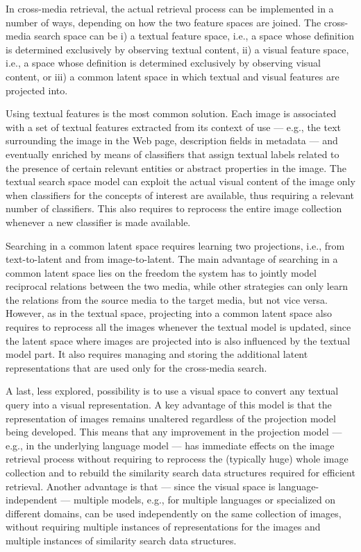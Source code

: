In cross-media retrieval, the actual retrieval process can be implemented in a number of ways, depending on how the two feature spaces are joined.
The cross-media search space can be i) a textual feature space, i.e.,  a space whose definition is determined exclusively by observing textual content, ii)
a visual feature space, i.e.,  a space whose definition is determined exclusively by observing visual content,
or iii) a common latent space in which textual and visual features are projected into.

Using textual features is the most common solution. %
Each image is associated with a set of textual features extracted from its context of use --- e.g., the text surrounding the image in the Web page, description fields in metadata --- and eventually enriched by means of classifiers that assign textual labels related to the presence of certain relevant entities or abstract properties in the image.
The textual search space model can exploit the actual visual content of the image only when classifiers for the concepts of interest are available, thus requiring a relevant number of classifiers.
This also requires to reprocess the entire image collection whenever a new classifier is made available.

Searching in a common latent space requires learning two projections, i.e.,  from text-to-latent and from image-to-latent.
The main advantage of searching in a common latent space lies on the freedom the system has to jointly model reciprocal relations between the two media, while other strategies can only learn the relations from the source media to the target media, but not vice versa.
However, as in the textual space, projecting into a common latent space also requires to reprocess all the images whenever the textual model is updated, since the latent space where images are projected into is also influenced by the textual model part.
It also requires managing and storing the additional latent representations that are used only for the cross-media search.

A last, less explored, possibility is to use a visual space to convert any textual query into a visual representation.
A key advantage of this model is that the representation of images remains unaltered regardless of the projection model being developed.
This means that any improvement in the projection model --- e.g., in the underlying language model --- has immediate effects on the image retrieval process without requiring to reprocess the (typically huge) whole image collection and to rebuild the similarity search data structures required for efficient retrieval.
Another advantage is that --- since the visual space is language-independent --- multiple models, e.g., for multiple languages or specialized on different domains, can be used independently on the same collection of images, without requiring multiple instances of representations for the images and multiple instances of similarity search data structures.

